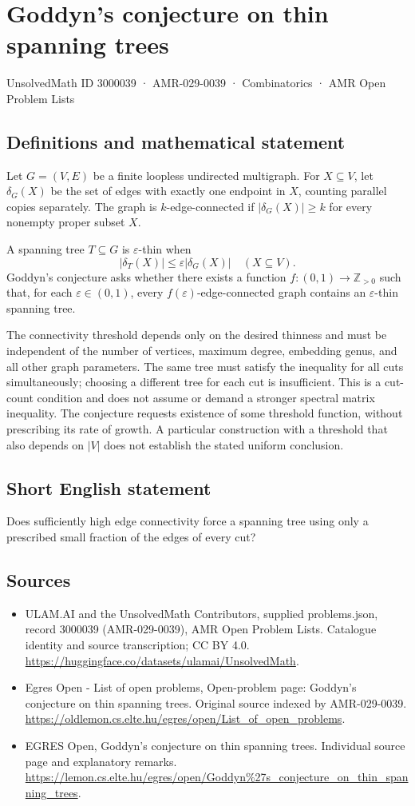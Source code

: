 \documentclass[11pt,a4paper]{article}
\begin{document}
\section*{Goddyn's conjecture on thin spanning trees}\label{3000039}
{\small UnsolvedMath ID 3000039 · AMR-029-0039 · Combinatorics · AMR Open Problem Lists}
\subsection{Definitions and mathematical statement}
Let $G=(V,E)$ be a finite loopless undirected multigraph. For
$X\subseteq V$, let $\delta_G(X)$ be the set of edges with exactly
one endpoint in $X$, counting parallel copies separately. The graph
is $k$-edge-connected if $|\delta_G(X)|\ge k$ for every nonempty proper
subset $X$.

A spanning tree $T\subseteq G$ is $\varepsilon$-thin when
\[
                         |\delta_T(X)|\le\varepsilon|\delta_G(X)|
                                            \quad(X\subseteq V).
\]
Goddyn's conjecture asks whether there exists a function
$f:(0,1)\to\mathbb Z_{>0}$ such that, for each $\varepsilon\in(0,1)$,
every $f(\varepsilon)$-edge-connected graph contains an
$\varepsilon$-thin spanning tree.

The connectivity threshold depends only on the desired thinness and
must be independent of the number of vertices, maximum degree,
embedding genus, and all other graph parameters. The same tree must
satisfy the inequality for all cuts simultaneously; choosing a different
tree for each cut is insufficient. This is a cut-count condition and
does not assume or demand a stronger spectral matrix inequality.
The conjecture requests existence of some threshold function, without
prescribing its rate of growth. A particular construction with a
threshold that also depends on $|V|$ does not establish the stated
uniform conclusion.
\subsection{Short English statement}
Does sufficiently high edge connectivity force a spanning tree
using only a prescribed small fraction of the edges of every cut?
\subsection{Sources}
\begin{itemize}
\item[S1] ULAM.AI and the UnsolvedMath Contributors, supplied problems.json, record 3000039 (AMR-029-0039), AMR Open Problem Lists. Catalogue identity and source transcription; CC BY 4.0.
\url{https://huggingface.co/datasets/ulamai/UnsolvedMath}.
\item[S2] Egres Open - List of open problems, Open-problem page: Goddyn's conjecture on thin spanning trees. Original source indexed by AMR-029-0039.
\url{https://oldlemon.cs.elte.hu/egres/open/List_of_open_problems}.
\item[S3] EGRES Open, Goddyn's conjecture on thin spanning trees. Individual source page and explanatory remarks.
\url{https://lemon.cs.elte.hu/egres/open/Goddyn%27s_conjecture_on_thin_spanning_trees}.
\end{itemize}
\end{document}

